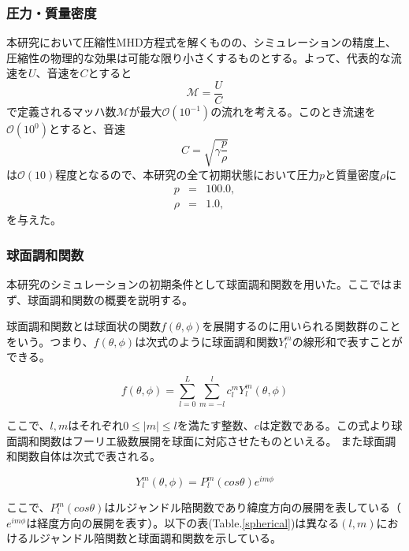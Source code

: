 \documentclass[12pt]{jsarticle}
\begin{document}
\subsubsection{圧力・質量密度}
本研究において圧縮性MHD方程式を解くものの、シミュレーションの精度上、圧縮性の物理的な効果は可能な限り小さくするものとする。よって、代表的な流速を$U$、音速を$C$とすると
\begin{equation}
\mathcal{M} = \frac{U}{C}
\end{equation}
で定義されるマッハ数$\mathcal{M}$が最大$\mathcal{O}(10^{-1})$の流れを考える。このとき流速を$\mathcal{O}(10^0)$とすると、音速
\begin{equation}
C = \sqrt{\gamma\frac{p}{\rho}}
\end{equation}
は$\mathcal{O}(10)$程度となるので、本研究の全て初期状態において圧力$p$と質量密度$\rho$に
\begin{eqnarray}
p &=& 100.0, \\
\rho &=& 1.0, 
\end{eqnarray}
を与えた。

\subsubsection{球面調和関数}
本研究のシミュレーションの初期条件として球面調和関数を用いた。ここではまず、球面調和関数の概要を説明する。

球面調和関数とは球面状の関数$f(\theta,\phi)$を展開するのに用いられる関数群のことをいう。つまり、$f(\theta,\phi)$は次式のように球面調和関数$Y_l^m$の線形和で表すことができる。

\begin{equation}
f(\theta,\phi) = \sum_{l=0}^L \sum_{m=-l}^l c_l^m Y_l^m (\theta,\phi)
\end{equation}

ここで、$l,m$はそれぞれ$0\leq |m| \leq l$を満たす整数、$c$は定数である。この式より球面調和関数はフーリエ級数展開を球面に対応させたものといえる。
また球面調和関数自体は次式で表される。

\begin{equation}
Y_l^m(\theta,\phi) = P_l^m (cos\theta)e^{im\phi}
\end{equation}

ここで、$P_l^m (cos\theta)$はルジャンドル陪関数であり緯度方向の展開を表している（$e^{im\phi}$は経度方向の展開を表す）。以下の表(Table.\ref{spherical})は異なる$(l,m)$におけるルジャンドル陪関数と球面調和関数を示している。
\end{document}
